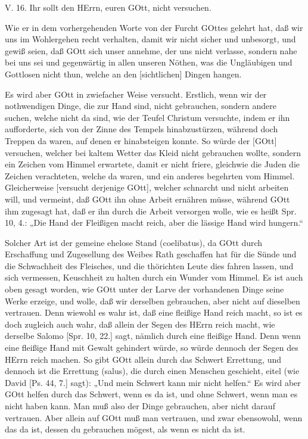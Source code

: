\begin{schriftzitat}
V. 16. Ihr sollt den HErrn, euren GOtt, nicht versuchen.
\end{schriftzitat}

Wie er in dem vorhergehenden Worte von der Furcht GOttes gelehrt hat, daß wir uns im Wohlergehen recht verhalten, damit wir nicht sicher und unbesorgt, und gewiß seien, daß GOtt sich unser annehme, der uns nicht verlasse, sondern nahe bei uns sei und gegenwärtig in allen unseren Nöthen, was die Ungläubigen und Gottlosen nicht thun, welche an den [sichtlichen] Dingen hangen.

Es wird aber GOtt in zwiefacher Weise versucht. Erstlich, wenn wir der nothwendigen Dinge, die zur Hand sind, nicht gebrauchen, sondern andere suchen, welche nicht da sind, wie der Teufel Christum versuchte, indem er ihn aufforderte, sich von der Zinne des Tempels hinabzustürzen, während doch Treppen da waren, auf denen er hinabsteigen konnte. So würde der [GOtt] versuchen, welcher bei kaltem Wetter das Kleid nicht gebrauchen wollte, sondern ein Zeichen vom Himmel erwartete, damit er nicht friere, gleichwie die Juden die Zeichen verachteten, welche da waren, und ein anderes begehrten vom Himmel. Gleicherweise [versucht derjenige GOtt], welcher schnarcht und nicht arbeiten will, und vermeint, daß GOtt ihn ohne Arbeit ernähren müsse, während GOtt ihm zugesagt hat, daß er ihn durch die Arbeit versorgen wolle, wie es heißt Spr. 10, 4.: „Die Hand der Fleißigen macht reich, aber die lässige Hand wird hungern.“

Solcher Art ist der gemeine ehelose Stand (coelibatus), da GOtt durch Erschaffung und Zugesellung des Weibes Rath geschaffen hat für die Sünde und die Schwachheit des Fleisches, und die thörichten Leute dies fahren lassen, und sich vermessen, Keuschheit zu halten durch ein Wunder vom Himmel. Es ist auch oben gesagt worden, wie GOtt unter der Larve der vorhandenen Dinge seine Werke erzeige, und wolle, daß wir derselben gebrauchen, aber nicht auf dieselben vertrauen. Denn wiewohl es wahr ist, daß eine fleißige Hand reich macht, so ist es doch zugleich auch wahr, daß allein der Segen des HErrn reich macht, wie derselbe Salomo [Spr. 10, 22.] sagt, nämlich durch eine fleißige Hand. Denn wenn eine fleißige Hand mit Gewalt gehindert würde, so würde dennoch der Segen des HErrn reich machen. So gibt GOtt allein durch das Schwert Errettung, und dennoch ist die Errettung (salus), die durch einen Menschen geschieht, eitel (wie David [Ps. 44, 7.] sagt): „Und mein Schwert kann mir nicht helfen.“ Es wird aber GOtt helfen durch das Schwert, wenn es da ist, und ohne Schwert, wenn man es nicht haben kann. Man muß also
der Dinge gebrauchen, aber nicht darauf vertrauen. Aber allein auf GOtt muß man vertrauen, und zwar ebensowohl, wenn das da ist, dessen du gebrauchen mögest, als wenn es nicht da ist.

